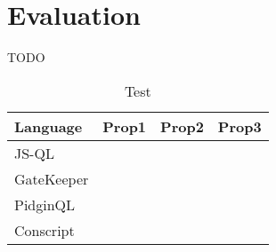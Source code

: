\section{Evaluation}
\label{sec:ValidationEvaluation}
TODO


  \begin{table}\begin{center}
    \begin{tabular}{ | l || l | l | l |}
    \hline
    Language & Prop1 & Prop2 & Prop3 \\ \hline
    JS-QL &  &  & \\ \hline
    GateKeeper &  &  & \\ \hline
    PidginQL &  &  & \\ \hline
    Conscript &  &  & \\ \hline
    \end{tabular}
    \caption*{Test}\end{center}
  \end{table}

